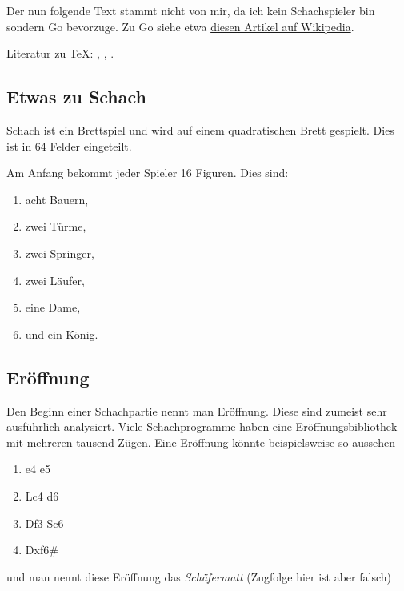 \begin{refsection}
\begin{itemize}[nosep, topsep=1em]
\end{itemize}

Der nun folgende Text stammt nicht von mir, da ich kein Schachspieler bin sondern Go bevorzuge.
Zu Go siehe etwa \href{https://bit.ly/3CEdJom}{diesen Artikel auf Wikipedia}.

Literatur zu \TeX{}: \textcite{kohm:2020}, \textcite{voss:2012a,voss:2017b}, \textcite{latextipps5}.

\subsection{Etwas zu Schach}

Schach ist ein Brettspiel und wird auf einem quadratischen Brett gespielt. Dies ist in 64 Felder eingeteilt.

Am Anfang bekommt jeder Spieler 16 Figuren. Dies sind:
\begin{enumerate}[label=\textbullet, nosep]  %
  \item 
  acht Bauern,
  \item 
  zwei Türme,
  \item 
  zwei Springer,
  \item 
  zwei Läufer,
  \item 
  eine Dame,
  \item 
  und ein König.
\end{enumerate}

\subsection{Eröffnung}
Den Beginn einer Schachpartie nennt man Eröffnung. 
Diese sind zumeist sehr ausführlich analysiert. 
Viele Schachprogramme haben eine Eröffnungsbibliothek mit mehreren tausend Zügen. 
Eine Eröffnung könnte beispielsweise so aussehen
%
\begin{enumerate}[--, nosep]
  \item e4 e5
  \item Lc4 d6
  \item Df3 Sc6
  \item Dxf6\#
\end{enumerate}

und man nennt diese Eröffnung das \emph{Schäfermatt} (Zugfolge hier ist aber falsch)

%



\end{refsection}
